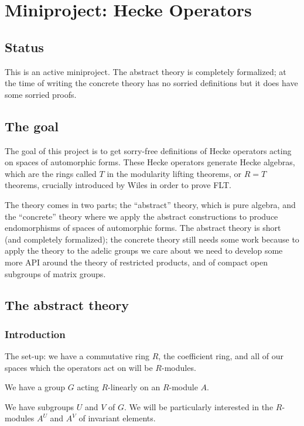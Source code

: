 \chapter{Miniproject: Hecke Operators}\label{HeckeOperator_project}

\section{Status}

This is an active miniproject. The abstract theory is completely formalized;
at the time of writing the concrete theory has no sorried definitions
but it does have some sorried proofs.

\section{The goal}

The goal of this project is to get sorry-free definitions of Hecke operators
acting on spaces of automorphic forms. These Hecke operators generate
Hecke algebras, which are the rings called $T$ in the modularity lifting theorems,
or $R=T$ theorems, crucially introduced by Wiles in order to prove FLT.

The theory comes in two parts;
the ``abstract'' theory, which is pure algebra, and the ``concrete'' theory
where we apply the abstract constructions to produce endomorphisms of
spaces of automorphic forms. The abstract theory is short (and completely formalized);
the concrete theory still needs some work because to apply the theory to the
adelic groups we care about we need to develop some more API around the theory
of restricted products, and of compact open subgroups of matrix groups.

\section{The abstract theory}

\subsection{Introduction}

The set-up: we have a commutative ring $R$, the coefficient ring, and
all of our spaces which the operators act on will be $R$-modules.

We have a group $G$ acting $R$-linearly on an $R$-module $A$.

We have subgroups $U$ and $V$ of $G$.
We will be particularly interested in the $R$-modules $A^U$ and $A^V$
of invariant elements.

